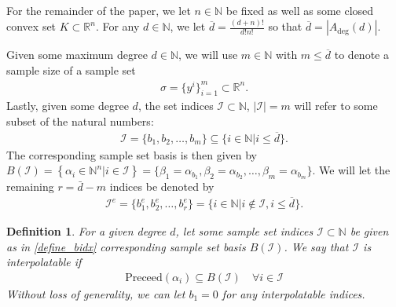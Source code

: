 \documentclass{article}
\newenvironment{comment}
  {\par\medskip
   \color{red}%
   \begin{framed}
   \textbf{Comment: }\ignorespaces}
 {\end{framed}
  \medskip}
\newtheorem{definition}{Definition}[theorem]
\theoremstyle{case}
\newcommand{\naturals}{\mathbb N}
\newcommand{\natsn}{\naturals^n}
\newcommand{\Rn}{\mathbb R^n}
\newcommand{\preceed}{{\textrm{Preceed}}}
\newcommand{\Adeg}{{A_{\textrm{deg}}}}
\newcommand{\bidx}{{\mathcal I}}
\newcommand{\bsub}{{B(\bidx)}}
\newcommand{\ridx}{{\mathcal I^e}}
\begin{document}
\subsection{}
For the remainder of the paper, we let $n \in \naturals$ be fixed as well as some closed convex set $K \subset \mathbb R^n$.
For any $d \in \naturals$, we let $\overline d = \frac{(d + n)!}{d!n!}$ so that
$\overline d = \left|\Adeg(d)\right|$.

Given some maximum degree $d \in \naturals$, we will 
use $m \in \naturals$ with $m \le \overline d$ to denote a sample size of a sample set
\begin{align}
\sigma = \{y^i\}^m_{i=1} \subset \Rn. \label{define_sigma}
\end{align}
Lastly, given some degree $d$, the set indices $\bidx \subset \naturals$, $|\bidx| = m$ will refer to some subset of the natural numbers:
\begin{align}
\bidx = \{b_1, b_2, \ldots, b_m\} \subseteq \{i \in \naturals | i \le \overline d \}. \label{define_bidx}
\end{align}
The corresponding sample set basis is then given by
$\bsub = \left\{\alpha_i \in \natsn | i \in \bidx\right\} = \{\beta_1 = \alpha_{b_1}, \beta_2 = \alpha_{b_2}, \ldots, \beta_m = \alpha_{b_m}\}$.
We will let the remaining $r = \bar d - m$ indices be denoted by
\begin{align}
\ridx = \{b^e_1, b^e_2, \ldots, b^e_r\} = \{i \in \naturals | i \not \in \bidx, i \le \overline d\}. \label{define_ridx}
\end{align}
\begin{definition}
For a given degree $d$, let some sample set indices $\bidx \subset \naturals$ be given as in \cref{define_bidx} corresponding sample set basis $\bsub$.
We say that $\bidx$ is \emph{interpolatable} if 
\begin{align}
\preceed(\alpha_i) \subseteq \bsub \quad \forall i \in \bidx \label{interpolatable}
\end{align}
Without loss of generality, we can let $b_1 = 0$ for any interpolatable indices.
\end{definition}
\end{document}
